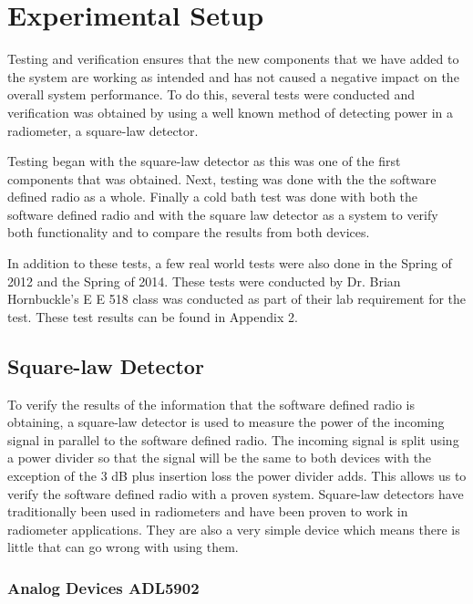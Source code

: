 \chapter{Experimental Setup}

Testing and verification ensures that the new components that we have added to the system are working as intended and has not caused a negative impact on the overall system performance.  To do this, several tests were conducted and verification was obtained by using a well known method of detecting power in a radiometer, a square-law detector.  

Testing began with the square-law detector as this was one of the first components that was obtained.  Next, testing was done with the the software defined radio as a whole.  Finally a cold bath test was done with both the software defined radio and with the square law detector as a system to verify both functionality and to compare the results from both devices.  

In addition to these tests, a few real world tests were also done in the Spring of 2012 and the Spring of 2014.  These tests were conducted by Dr. Brian Hornbuckle's E E 518 class was conducted as part of their lab requirement for the test.  These test results can be found in Appendix 2.

\section{Square-law Detector}
To verify the results of the information that the software defined radio is obtaining, a square-law detector is used to measure the power of the incoming signal in parallel to the software defined radio.  The incoming signal is split using a power divider so that the signal will be the same to both devices with the exception of the 3 dB plus insertion loss the power divider adds.  This allows us to verify the software defined radio with a proven system.  Square-law detectors have traditionally been used in radiometers and have been proven to work in radiometer applications.  They are also a very simple device which means there is little that can go wrong with using them.


\subsection{Analog Devices ADL5902}

